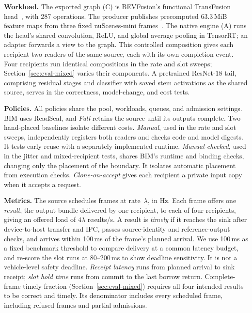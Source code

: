 \documentclass[conference]{IEEEtran}
\newcommand{\MiB}{\,MiB}
\newcommand{\ms}{\,ms}
\begin{document}
\textbf{Workload.} The exported graph (C) is BEVFusion's functional TransFusion head~\cite{bevfusion,transfusion}, with 287 operations. The producer publishes precomputed 63.3\MiB{} feature maps from three fixed nuScenes-mini frames~\cite{nuscenes}. The native engine (A) runs the head's shared convolution, ReLU, and global average pooling in TensorRT; an adapter forwards a view to the graph. This controlled composition gives each recipient two readers of the same source, each with its own completion event. Four recipients run identical compositions in the rate and slot sweeps; Section~\ref{sec:eval-mixed} varies their components. A pretrained ResNet-18 tail, comprising residual stages and classifier with saved stem activations as the shared source, serves in the correctness, model-change, and cost tests.

\textbf{Policies.} All policies share the pool, workloads, queues, and admission settings. BIM uses ReadSeal, and \emph{Full} retains the source until its outputs complete. Two hand-placed baselines isolate different costs. \emph{Manual}, used in the rate and slot sweeps, independently registers both readers and checks code and model digests. It tests early reuse with a separately implemented runtime. \emph{Manual-checked}, used in the jitter and mixed-recipient tests, shares BIM's runtime and binding checks, changing only the placement of the boundary. It isolates automatic placement from execution checks. \emph{Clone-on-accept} gives each recipient a private input copy when it accepts a request.

\textbf{Metrics.} The source schedules frames at rate~$\lambda$, in Hz. Each frame offers one \emph{result}, the output bundle delivered by one recipient, to each of four recipients, giving an offered load of $4\lambda$ results/s. A result is \emph{timely} if it reaches the sink after device-to-host transfer and IPC, passes source-identity and reference-output checks, and arrives within 100\ms{} of the frame's planned arrival. We use 100\ms{} as a fixed benchmark threshold to compare delivery at a common latency budget, and re-score the slot runs at 80--200\ms{} to show deadline sensitivity. It is not a vehicle-level safety deadline. \emph{Receipt latency} runs from planned arrival to sink receipt; \emph{slot hold time} runs from commit to the last borrow return. Complete-frame timely fraction (Section~\ref{sec:eval-mixed}) requires all four intended results to be correct and timely. Its denominator includes every scheduled frame, including refused frames and partial admissions.
\end{document}
